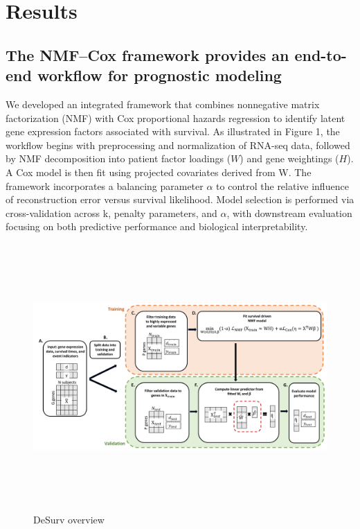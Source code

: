 \documentclass[9pt,twocolumn,twoside,]{pnas-new}
\begin{document}
\section*{Results}\label{results}

\subsection{The NMF--Cox framework provides an end-to-end workflow for
prognostic
modeling}\label{the-nmfcox-framework-provides-an-end-to-end-workflow-for-prognostic-modeling}

We developed an integrated framework that combines nonnegative matrix
factorization (NMF) with Cox proportional hazards regression to identify
latent gene expression factors associated with survival. As illustrated
in Figure 1, the workflow begins with preprocessing and normalization of
RNA-seq data, followed by NMF decomposition into patient factor loadings
(\(W\)) and gene weightings (\(H\)). A Cox model is then fit using
projected covariates derived from W. The framework incorporates a
balancing parameter \(\alpha\) to control the relative influence of
reconstruction error versus survival likelihood. Model selection is
performed via cross-validation across k, penalty parameters, and
\(\alpha\), with downstream evaluation focusing on both predictive
performance and biological interpretability.

\begin{figure}[t]

{\centering \includegraphics[width=\textwidth,height=4in]{../figures/model_schematic_with_validation} 

}

\caption{DeSurv overview}\label{fig:fig-schema}
\end{figure}
\end{document}
